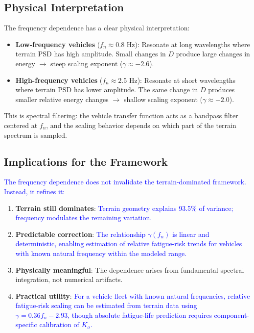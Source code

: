 \documentclass[11pt]{article}
\begin{document}
\subsection{Physical Interpretation}

The frequency dependence has a clear physical interpretation:

\begin{itemize}
\item \textbf{Low-frequency vehicles} ($f_n \approx 0.8$ Hz): Resonate at long wavelengths where terrain PSD has high amplitude. Small changes in $D$ produce large changes in energy $\rightarrow$ steep scaling exponent ($\gamma \approx -2.6$).

\item \textbf{High-frequency vehicles} ($f_n \approx 2.5$ Hz): Resonate at short wavelengths where terrain PSD has lower amplitude. The same change in $D$ produces smaller relative energy changes $\rightarrow$ shallow scaling exponent ($\gamma \approx -2.0$).
\end{itemize}

This is spectral filtering: the vehicle transfer function acts as a bandpass filter centered at $f_n$, and the scaling behavior depends on which part of the terrain spectrum is sampled.

\subsection{Implications for the Framework}

\textcolor{blue}{The frequency dependence does not invalidate the terrain-dominated framework. Instead, it refines it:}

\begin{enumerate}
\item \textbf{Terrain still dominates}: \textcolor{blue}{Terrain geometry explains 93.5\% of variance; frequency modulates the remaining variation.}

\item \textbf{Predictable correction}: \textcolor{blue}{The relationship $\gamma(f_n)$ is linear and deterministic, enabling estimation of relative fatigue-risk trends for vehicles with known natural frequency within the modeled range.}

\item \textbf{Physically meaningful}: The dependence arises from fundamental spectral integration, not numerical artifacts.

\item \textbf{Practical utility}: \textcolor{blue}{For a vehicle fleet with known natural frequencies, relative fatigue-risk scaling can be estimated from terrain data using $\gamma = 0.36 f_n - 2.93$, though absolute fatigue-life prediction requires component-specific calibration of $K_\sigma$.}
\end{enumerate}
\end{document}

